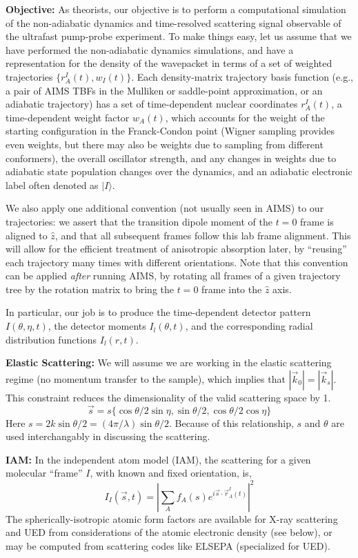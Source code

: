 \documentclass[fleqn,oneside,12pt]{article}
\begin{document}
\textbf{Objective:} As theorists, our objective is to perform a computational
simulation of the non-adiabatic dynamics and time-resolved scattering signal
observable of the ultrafast pump-probe experiment. To make things easy, let us
assume that we have performed the non-adiabatic dynamics simulations, and have a
representation for the density of the wavepacket in terms of a set of weighted
trajectories $\{ r_{A}^{I} (t), w_{I} (t) \}$. Each density-matrix trajectory
basis function (e.g., a pair of AIMS TBFs in the Mulliken or saddle-point
approximation, or an adiabatic trajectory) has a set of time-dependent nuclear
coordinates $r_{A}^{I} (t)$, a time-dependent weight factor $w_{A} (t)$, which
accounts for the weight of the starting configuration in the Franck-Condon point
(Wigner sampling provides even weights, but there may also be weights due to
sampling from different conformers), the overall oscillator strength, and any
changes in weights due to adiabatic state population changes over the dynamics,
and an adiabatic electronic label often denoted as $|I\rangle$.

We also apply one additional convention (not usually seen in AIMS) to our
trajectories: we assert that the transition dipole moment of the $t=0$ frame is
aligned to $\hat z$, and that all subsequent frames follow this lab frame
alignment. This will allow for the efficient treatment of anisotropic absorption
later, by ``reusing'' each trajectory many times with different orientations.
Note that this convention can be applied \emph{after} running AIMS, by rotating
all frames of a given trajectory tree by the rotation matrix to bring the $t=0$
frame into the $\hat z$ axis.

In particular, our job is to produce the time-dependent detector pattern $I
(\theta, \eta, t)$, the detector moments $I_{l} (\theta, t)$, and the
corresponding radial distribution functions $I_{l} (r, t)$.

\textbf{Elastic Scattering:} We will assume we are working in the elastic
scattering regime (no momentum transfer to the sample), which implies that
$|\vec k_0| = |\vec k_s|$. This constraint reduces the dimensionality of the
valid scattering space by 1.
\[
\vec s = 
s 
\{
\cos \theta / 2 \sin \eta,
\sin \theta / 2,
\cos \theta / 2 \cos \eta
\}
\]
Here $s = 2 k \sin \theta / 2 = (4 \pi / \lambda) \sin \theta / 2$. Because of
this relationship, $s$ and $\theta$ are used interchangably in discussing the
scattering.

\textbf{IAM:} In the independent atom model (IAM), the scattering for a given
molecular ``frame'' $I$, with known and fixed orientation, is,
\[
I_{I} (\vec s, t)
=   
\left |
\sum_{A}
f_{A} (s)
e^{i \vec s \cdot \vec r_{A}^{I} (t)}
\right |^2
\]
The spherically-isotropic atomic form factors are available for X-ray scattering
and UED from considerations of the atomic electronic density (see below), or may
be computed from scattering codes like ELSEPA (specialized for UED).
\end{document}
